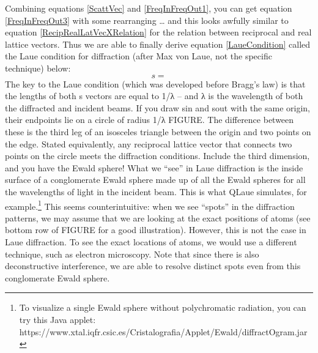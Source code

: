 Combining equations \ref{ScattVec} and \ref{FreqInFreqOut1}, you can get equation \ref{FreqInFreqOut3} with some rearranging … and this looks awfully similar to equation \ref{RecipRealLatVecXRelation} for the relation between reciprocal and real lattice vectors. Thus we are able to finally derive equation \ref{LaueCondition} called the Laue condition for diffraction (after Max von Laue, not the specific technique) below: 
\begin{equation}
    s=
    \label{LaueCondition}
\end{equation}
The key to the Laue condition (which was developed before Bragg’s law)  is that the lengths of both s vectors are equal to 1/λ – and λ is the wavelength of both the diffracted and incident beams. If you draw sin and sout with the same origin, their endpoints lie on a circle of radius 1/λ FIGURE. The difference between these is the third leg of an isosceles triangle between the origin and two points on the edge. Stated equivalently, any reciprocal lattice vector that connects two points on the circle meets the diffraction conditions. 
Include the third dimension, and you have the Ewald sphere!
What we “see” in Laue diffraction is the inside surface of a conglomerate Ewald sphere made up of all the Ewald spheres for all the wavelengths of light in the incident beam. This is what QLaue simulates, for example.\footnote{To visualize a single Ewald sphere without polychromatic radiation, you can try this Java applet: https://www.xtal.iqfr.csic.es/Cristalografia/Applet/Ewald/diffractOgram.jar}
This seems counterintuitive: when we see “spots” in the diffraction patterns, we may assume that we are looking at the exact positions of atoms (see bottom row of FIGURE for a good illustration). However, this is not the case in Laue diffraction. To see the exact locations of atoms, we would use a different technique, such as electron microscopy.
Note that since there is also deconstructive interference, we are able to resolve distinct spots even from this conglomerate Ewald sphere. 
